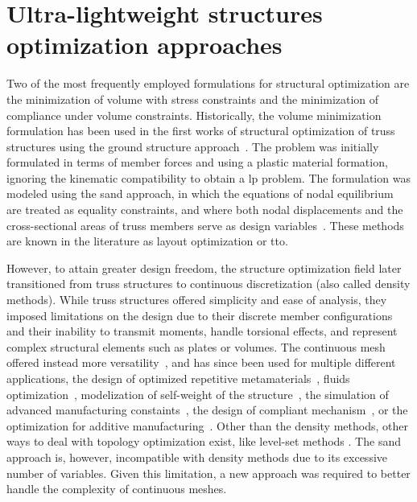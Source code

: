 \section{Ultra-lightweight structures optimization approaches}
Two of the most frequently employed formulations for structural optimization are the minimization of volume with stress constraints and the minimization of compliance under volume constraints. Historically, the volume minimization formulation has been used in the first works of structural optimization of truss structures using the ground structure approach~. The problem was initially formulated in terms of member forces and using a plastic material formation, ignoring the kinematic compatibility to obtain a \gls{lp} problem. The formulation was modeled using the \gls{sand} approach, in which the equations of nodal equilibrium are treated as equality constraints, and where both nodal displacements and the cross-sectional areas of truss members serve as design variables~. These methods are known in the literature as layout optimization or \gls{tto}. 

However, to attain greater design freedom, the structure optimization field later transitioned from truss structures to continuous discretization (also called density methods). While truss structures offered simplicity and ease of analysis, they imposed limitations on the design due to their discrete member configurations and their inability to transmit moments, handle torsional effects, and represent complex structural elements such as plates or volumes. The continuous mesh offered instead more versatility~, and has since been used for multiple different applications, \eg the design of optimized repetitive metamaterials~, fluids optimization~, modelization of self-weight of the structure~, the simulation of advanced manufacturing constaints~, the design of compliant mechanism~, or the optimization for additive manufacturing~. Other than the density methods, other ways to deal with topology optimization exist, like level-set methods . The \gls{sand} approach is, however, incompatible with density methods due to its excessive number of variables. Given this limitation, a new approach was required to better handle the complexity of continuous meshes.

